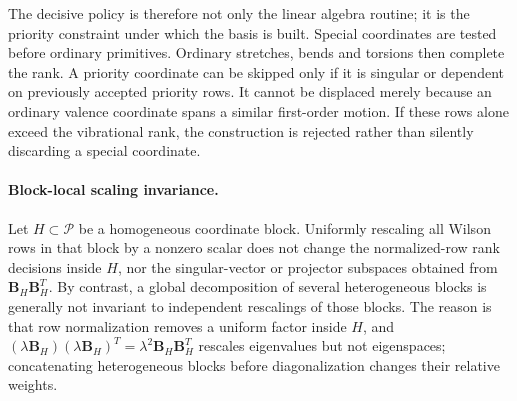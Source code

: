 \documentclass[journal=jctcce,manuscript=article,layout=traditional]{achemso}
\newcommand{\Bmat}{\mathbf{B}}
\theoremstyle{definition}
\begin{document}
The decisive policy is therefore not only the linear algebra routine; it is the
priority constraint under which the basis is built.  Special coordinates are
tested before ordinary primitives.  Ordinary stretches, bends and torsions then
complete the rank.  A priority coordinate can be skipped only if it is singular
or dependent on previously accepted priority rows.  It cannot be displaced
merely because an ordinary valence coordinate spans a similar first-order
motion.  If these rows alone exceed the vibrational rank, the construction is
rejected rather than silently discarding a special coordinate.

\paragraph{Block-local scaling invariance.}
\label{thm:block-scaling}
Let \(H\subset\mathcal{P}\) be a homogeneous coordinate block.  Uniformly
rescaling all Wilson rows in that block by a nonzero scalar does not change the
normalized-row rank decisions inside \(H\), nor the singular-vector or projector
subspaces obtained from \(\Bmat_H\Bmat_H^T\).  By contrast, a global
decomposition of several heterogeneous blocks is generally not invariant to
independent rescalings of those blocks.
The reason is that row normalization removes a uniform factor inside \(H\), and
\((\lambda\Bmat_H)(\lambda\Bmat_H)^T=\lambda^2\Bmat_H\Bmat_H^T\) rescales
eigenvalues but not eigenspaces; concatenating heterogeneous blocks before
diagonalization changes their relative weights.
\end{document}
